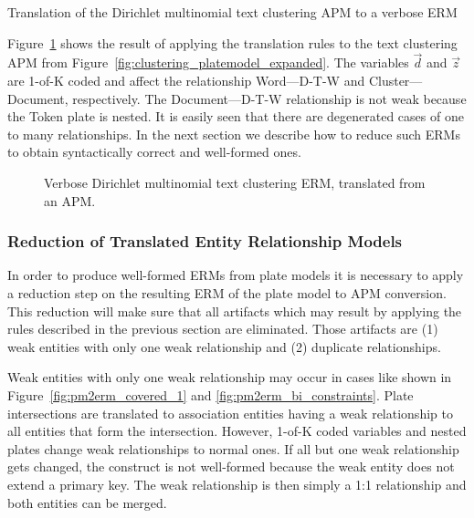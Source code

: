 \begin{Example} Translation of the Dirichlet multinomial text clustering APM to a verbose ERM

Figure~\ref{fig:clustering_erm_good_verbose} shows the result of applying the translation rules to the text clustering APM from Figure~\ref{fig:clustering_platemodel_expanded}. The variables $\vec d$ and $\vec z$ are 1-of-K coded and affect the relationship Word---D-T-W and Cluster---Document, respectively. The Document---D-T-W relationship is not weak because the Token plate is nested. It is easily seen that there are degenerated cases of one to many relationships. In the next section we describe how to reduce such ERMs to obtain syntactically correct and well-formed ones.

\end{Example}

\begin{figure}[h]
\centering
\scalebox{\tikzScale}{\adjustTikzSize }
\caption{Verbose Dirichlet multinomial text clustering ERM, translated from an APM.}\label{fig:clustering_erm_good_verbose}
\end{figure}

\subsubsection{Reduction of Translated Entity Relationship Models}
\label{sec:erm_reduction}

In order to produce well-formed ERMs from plate models it is necessary to apply a reduction step on the resulting ERM of the plate model to APM conversion. This reduction will make sure that all artifacts which may result by applying the rules described in the previous section are eliminated. Those artifacts are (1) weak entities with only one weak relationship and (2) duplicate relationships.

Weak entities with only one weak relationship may occur in cases like shown in Figure~\ref{fig:pm2erm_covered_1} and \ref{fig:pm2erm_bi_constraints}. Plate intersections are translated to association entities having a weak relationship to all entities that form the intersection. However, 1-of-K coded variables and nested plates change weak relationships to normal ones. If all but one weak relationship gets changed, the construct is not well-formed because the weak entity does not extend a primary key. The weak relationship is then simply a 1:1 relationship and both entities can be merged.

